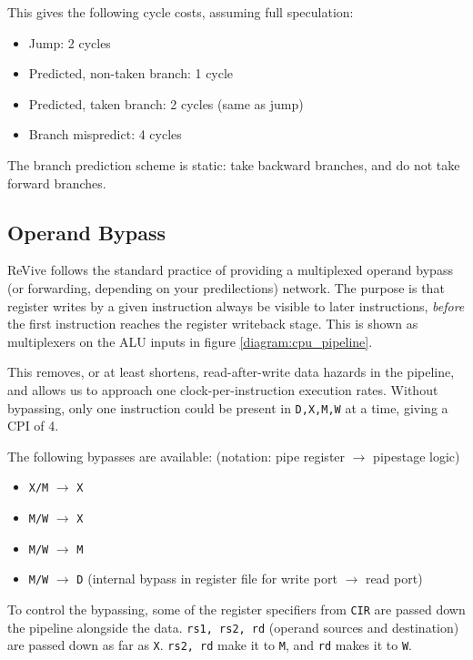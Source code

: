 \documentclass{article}
\begin{document}
This gives the following cycle costs, assuming full speculation:
\begin{itemize}
\item Jump: 2 cycles
\item Predicted, non-taken branch: 1 cycle
\item Predicted, taken branch: 2 cycles (same as jump)
\item Branch mispredict: 4 cycles
\end{itemize}

The branch prediction scheme is static: take backward branches, and do not take forward branches.

\subsection{Operand Bypass}

ReVive follows the standard practice of providing a multiplexed operand bypass (or forwarding, depending on your predilections) network. The purpose is that register writes by a given instruction always be visible to later instructions, \textit{before} the first instruction reaches the register writeback stage. This is shown as multiplexers on the ALU inputs in figure \ref{diagram:cpu_pipeline}.

This removes, or at least shortens, read-after-write data hazards in the pipeline, and allows us to approach one clock-per-instruction execution rates. Without bypassing, only one instruction could be present in \texttt{D,X,M,W} at a time, giving a CPI of 4.

The following bypasses are available: (notation: pipe register $\to$ pipestage logic)

\begin{itemize}
	\item \texttt{X/M} $\to$ \texttt{X}
	\item \texttt{M/W} $\to$ \texttt{X}
	\item \texttt{M/W} $\to$ \texttt{M}
	\item \texttt{M/W} $\to$ \texttt{D} (internal bypass in register file for write port $\to$ read port)
\end{itemize}

To control the bypassing, some of the register specifiers from \texttt{CIR} are passed down the pipeline alongside the data. \texttt{rs1, rs2, rd} (operand sources and destination) are passed down as far as \texttt{X}. \texttt{rs2, rd} make it to \texttt{M}, and \texttt{rd} makes it to \texttt{W}.
\end{document}
